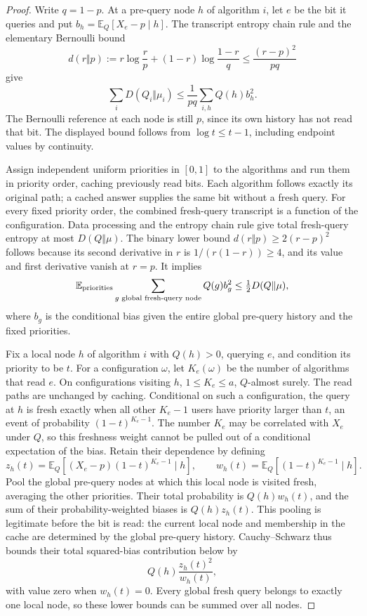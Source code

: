 \documentclass[11pt]{article}
\theoremstyle{definition}
\newcommand{\EE}{\mathbb E}
\begin{document}
\begin{proof}
Write $q=1-p$. At a pre-query node $h$ of algorithm $i$, let $e$
be the bit it queries and put
$b_h=\EE_Q[X_e-p\mid h]$. The transcript entropy chain rule and
the elementary Bernoulli bound
\[
 d(r\Vert p):=r\log\frac rp+(1-r)\log\frac{1-r}q
 \le\frac{(r-p)^2}{pq}
\]
give
\begin{equation}\label{eq:local-transcript-entropy}
 \sum_iD(Q_i\Vert\mu_i)
 \le\frac1{pq}\sum_{i,h}Q(h)b_h^2.
\end{equation}
The Bernoulli reference at each node is still $p$, since its own
history has not read that bit. The displayed bound follows from
$\log t\le t-1$, including endpoint values by continuity.

Assign independent uniform priorities in $[0,1]$ to the algorithms
and run them in priority order, caching previously read bits. Each
algorithm follows exactly its original path; a cached answer supplies
the same bit without a fresh query. For every fixed priority order,
the combined fresh-query transcript is a function of the configuration.
Data processing and the entropy chain rule give total fresh-query
entropy at most $D(Q\Vert\mu)$. The binary lower bound
$d(r\Vert p)\ge2(r-p)^2$ follows because its second derivative in
$r$ is $1/(r(1-r))\ge4$, and its value and first derivative vanish
at $r=p$. It implies
\begin{equation}\label{eq:global-transcript-budget}
 \EE_{\rm priorities}
 \sum_{g\text{ global fresh-query node}}Q(g)b_g^2
 \le\tfrac12D(Q\Vert\mu),
\end{equation}
where $b_g$ is the conditional bias given the entire global pre-query
history and the fixed priorities.

Fix a local node $h$ of algorithm $i$ with $Q(h)>0$, querying $e$,
and condition its priority to be $t$. For a configuration $\omega$,
let $K_e(\omega)$ be the number of algorithms that read $e$.
On configurations visiting $h$, $1\le K_e\le a$, $Q$-almost surely.
The read paths are unchanged by caching. Conditional on such a
configuration, the query at $h$ is fresh exactly when all other
$K_e-1$ users have priority larger than $t$, an event of probability
$(1-t)^{K_e-1}$.
The number $K_e$ may be correlated with $X_e$ under $Q$, so this
freshness weight cannot be pulled out of a conditional expectation of
the bias. Retain their dependence by defining
\[
 z_h(t)=\EE_Q[(X_e-p)(1-t)^{K_e-1}\mid h],\qquad
 w_h(t)=\EE_Q[(1-t)^{K_e-1}\mid h].
\]
Pool the global pre-query nodes at which this local node is visited
fresh, averaging the other priorities. Their total probability is
$Q(h)w_h(t)$, and the sum of their probability-weighted biases is
$Q(h)z_h(t)$. This pooling is legitimate before the bit is read:
the current local node and membership in the cache are determined by
the global pre-query history. Cauchy--Schwarz thus bounds their
total squared-bias contribution below by
\begin{equation}\label{eq:entropy-pooled-bias}
 Q(h)\frac{z_h(t)^2}{w_h(t)},
\end{equation}
with value zero when $w_h(t)=0$.
Every global fresh query belongs to exactly one local node, so these
lower bounds can be summed over all nodes.


\end{proof}
\end{document}
